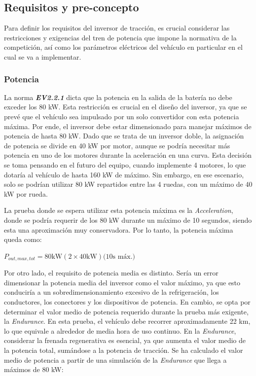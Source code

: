 \subsection{Requisitos y pre-concepto}

Para definir los requisitos del inversor de tracción, es crucial considerar las restricciones y exigencias del tren de potencia que impone la normativa de la competición, así como los parámetros eléctricos del vehículo en particular en el cual se va a implementar.

\subsubsection{Potencia}
La norma \textit{\textbf{EV2.2.1}} dicta que la potencia en la salida de la batería no debe exceder los 80 kW. Esta restricción es crucial en el diseño del inversor, ya que se prevé que el vehículo sea impulsado por un solo convertidor con esta potencia máxima. Por ende, el inversor debe estar dimensionado para manejar máximos de potencia de hasta 80 kW. Dado que se trata de un inversor doble, la asignación de potencia se divide en 40 kW por motor, aunque se podría necesitar más potencia en uno de los motores durante la aceleración en una curva. Esta decisión se toma pensando en el futuro del equipo, cuando implemente 4 motores, lo que dotaría al vehículo de hasta 160 kW de máximo. Sin embargo, en ese escenario, solo se podrían utilizar 80 kW repartidos entre las 4 ruedas, con un máximo de 40 kW por rueda.

La prueba donde se espera utilizar esta potencia máxima es la \textit{Acceleration}, donde se podría requerir de los 80 kW durante un máximo de 10 segundos, siendo esta una aproximación muy conservadora. Por lo tanto, la potencia máxima queda como:

\(P_{out, max, tot} = 80 \text{kW} (2 \times 40 \text{kW}) \text{(10s máx.)}\)


Por otro lado, el requisito de potencia media es distinto. Sería un error dimensionar la potencia media del inversor como el valor máximo, ya que esto conduciría a un sobredimensionamiento excesivo de la refrigeración, los conductores, los conectores y los dispositivos de potencia. En cambio, se opta por determinar el valor medio de potencia requerido durante la prueba más exigente, la \textit{Endurance}. En esta prueba, el vehículo debe recorrer aproximadamente 22 km, lo que equivale a alrededor de media hora de uso continuo. En la \textit{Endurance}, considerar la frenada regenerativa es esencial, ya que aumenta el valor medio de la potencia total, sumándose a la potencia de tracción. Se ha calculado el valor medio de potencia a partir de una simulación de la \textit{Endurance} que llega a máximos de 80 kW:

